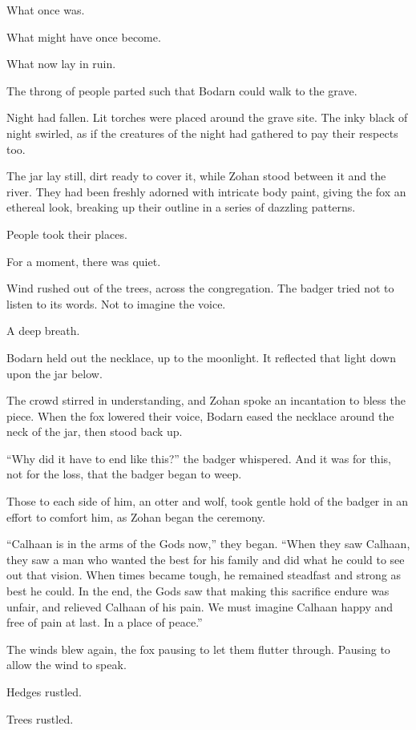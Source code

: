 What once was.

What might have once become.

What now lay in ruin.

The throng of people parted such that Bodarn could walk to the grave.

Night had fallen. Lit torches were placed around the grave site. The inky black of night swirled, as if the creatures of the night had gathered to pay their respects too.

The jar lay still, dirt ready to cover it, while Zohan stood between it and the river. They had been freshly adorned with intricate body paint, giving the fox an ethereal look, breaking up their outline in a series of dazzling patterns.

People took their places.

For a moment, there was quiet.

Wind rushed out of the trees, across the congregation. The badger tried not to listen to its words. Not to imagine the voice.

A deep breath.

Bodarn held out the necklace, up to the moonlight. It reflected that light down upon the jar below.

The crowd stirred in understanding, and Zohan spoke an incantation to bless the piece. When the fox lowered their voice, Bodarn eased the necklace around the neck of the jar, then stood back up.

``Why did it have to end like this?'' the badger whispered. And it was for this, not for the loss, that the badger began to weep.

Those to each side of him, an otter and wolf, took gentle hold of the badger in an effort to comfort him, as Zohan began the ceremony.

``Calhaan is in the arms of the Gods now,'' they began. ``When they saw Calhaan, they saw a man who wanted the best for his family and did what he could to see out that vision. When times became tough, he remained steadfast and strong as best he could. In the end, the Gods saw that making this sacrifice endure was unfair, and relieved Calhaan of his pain. We must imagine Calhaan happy and free of pain at last. In a place of peace.''

The winds blew again, the fox pausing to let them flutter through. Pausing to allow the wind to speak.

Hedges rustled.

Trees rustled.

